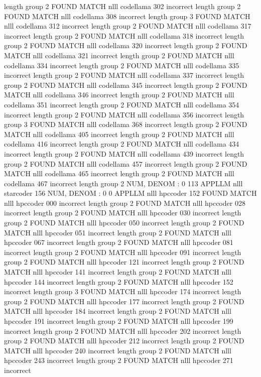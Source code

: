 length group  2
FOUND MATCH nlll codellama 302 incorrect
length group  2
FOUND MATCH nlll codellama 308 incorrect
length group  3
FOUND MATCH nlll codellama 312 incorrect
length group  2
FOUND MATCH nlll codellama 317 incorrect
length group  2
FOUND MATCH nlll codellama 318 incorrect
length group  2
FOUND MATCH nlll codellama 320 incorrect
length group  2
FOUND MATCH nlll codellama 321 incorrect
length group  2
FOUND MATCH nlll codellama 334 incorrect
length group  2
FOUND MATCH nlll codellama 335 incorrect
length group  2
FOUND MATCH nlll codellama 337 incorrect
length group  2
FOUND MATCH nlll codellama 345 incorrect
length group  2
FOUND MATCH nlll codellama 346 incorrect
length group  2
FOUND MATCH nlll codellama 351 incorrect
length group  2
FOUND MATCH nlll codellama 354 incorrect
length group  2
FOUND MATCH nlll codellama 356 incorrect
length group  3
FOUND MATCH nlll codellama 368 incorrect
length group  2
FOUND MATCH nlll codellama 405 incorrect
length group  2
FOUND MATCH nlll codellama 416 incorrect
length group  2
FOUND MATCH nlll codellama 434 incorrect
length group  2
FOUND MATCH nlll codellama 439 incorrect
length group  2
FOUND MATCH nlll codellama 457 incorrect
length group  2
FOUND MATCH nlll codellama 465 incorrect
length group  2
FOUND MATCH nlll codellama 467 incorrect
length group  2
NUM, DENOM : 0 113
APPLLM nlll starcoder
156
NUM, DENOM : 0 0
APPLLM nlll hpccoder
152
FOUND MATCH nlll hpccoder 000 incorrect
length group  2
FOUND MATCH nlll hpccoder 028 incorrect
length group  2
FOUND MATCH nlll hpccoder 030 incorrect
length group  2
FOUND MATCH nlll hpccoder 050 incorrect
length group  2
FOUND MATCH nlll hpccoder 051 incorrect
length group  2
FOUND MATCH nlll hpccoder 067 incorrect
length group  2
FOUND MATCH nlll hpccoder 081 incorrect
length group  2
FOUND MATCH nlll hpccoder 091 incorrect
length group  2
FOUND MATCH nlll hpccoder 121 incorrect
length group  2
FOUND MATCH nlll hpccoder 141 incorrect
length group  2
FOUND MATCH nlll hpccoder 144 incorrect
length group  2
FOUND MATCH nlll hpccoder 152 incorrect
length group  3
FOUND MATCH nlll hpccoder 174 incorrect
length group  2
FOUND MATCH nlll hpccoder 177 incorrect
length group  2
FOUND MATCH nlll hpccoder 184 incorrect
length group  2
FOUND MATCH nlll hpccoder 191 incorrect
length group  2
FOUND MATCH nlll hpccoder 199 incorrect
length group  2
FOUND MATCH nlll hpccoder 202 incorrect
length group  2
FOUND MATCH nlll hpccoder 212 incorrect
length group  2
FOUND MATCH nlll hpccoder 240 incorrect
length group  2
FOUND MATCH nlll hpccoder 243 incorrect
length group  2
FOUND MATCH nlll hpccoder 271 incorrect
